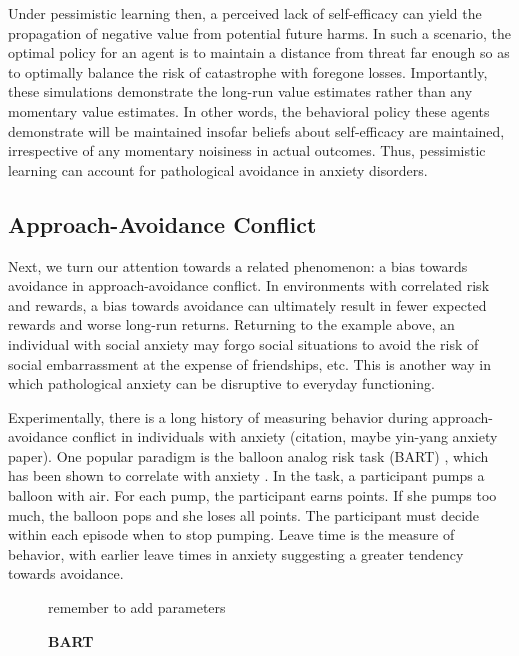 \documentclass[11pt]{article} %
\begin{document}
Under pessimistic learning then, a perceived lack of self-efficacy can yield the
propagation of negative value from potential future harms. In such a scenario,
the optimal policy for an agent is to maintain a distance from threat far enough
so as to optimally balance the risk of catastrophe with foregone losses. Importantly,
these simulations demonstrate the long-run value estimates rather than any momentary
value estimates. In other words, the behavioral policy these agents demonstrate
will be maintained insofar beliefs about self-efficacy are maintained, irrespective
of any momentary noisiness in actual outcomes. Thus, pessimistic learning can
account for pathological avoidance in anxiety disorders.

\subsection{Approach-Avoidance Conflict}

Next, we turn our attention towards a related phenomenon: a bias towards avoidance
in approach-avoidance conflict. In environments with correlated risk and rewards,
a bias towards avoidance can ultimately result in fewer expected rewards and worse
long-run returns. Returning to the example above, an individual with social anxiety
may forgo social situations to avoid the risk of social embarrassment at the expense
of friendships, etc. This is another way in which pathological anxiety can be
disruptive to everyday functioning.

Experimentally, there is a long history of measuring behavior during
approach-avoidance conflict in individuals with anxiety (citation, maybe yin-yang anxiety paper).
One popular paradigm is the balloon analog risk task (BART) \citep{Lejuez2002},
which has been shown to correlate with anxiety \cite{Maner2007, Giorgetta2012}.
In the task, a participant pumps a balloon with air. For each pump, the participant
earns points. If she pumps too much, the balloon pops and she loses all points.
The participant must decide within each episode when to stop pumping. Leave time
is the measure of behavior, with earlier leave times in anxiety suggesting a
greater tendency towards avoidance.

\begin{figure}
  \centerline{%
  }
  \caption{\textbf{BART}}
  \par remember to add parameters
\end{figure}
\end{document}
